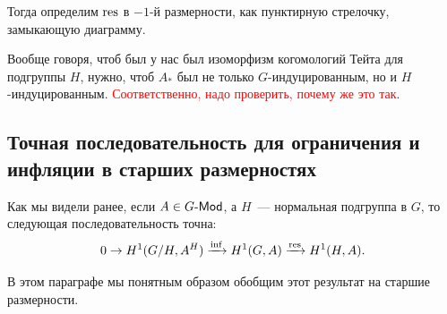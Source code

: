 	 Тогда определим $\operatorname{res}$ в $-1$-й размерности, как пунктирную стрелочку, замыкающую диаграмму. 

	 \begin{remark}
	 	Вообще говоря, чтоб был у нас был изоморфизм когомологий Тейта для подгруппы $H$, нужно, чтоб $A_*$ был не только $G$-индуцированным, но и $H$-индуцированным. \textcolor{red}{Соответственно, надо проверить, почему же это так}. 
	 \end{remark}

    \subsection{Точная последовательность для ограничения и инфляции в старших размерностях}

	  Как мы видели ранее, если $A \in G\text{-}\mathsf{Mod}$, а $H$~--- нормальная подгруппа в $G$, то следующая последовательность точна: 
	 	\[
	 		0 \to H^{1}(G/H, A^H) \xrightarrow{\inf} H^1(G, A) \xrightarrow{\operatorname{res}} H^1(H, A).
	 	\]

	 В этом параграфе мы понятным образом обобщим этот результат на старшие размерности. 


